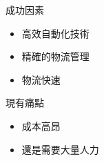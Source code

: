 \documentclass[10pt, aspectratio=169]{beamer}
\begin{document}
\begin{frame}[fragile]{成功因素}
  \begin{itemize}
    \item 高效自動化技術
    \item 精確的物流管理
    \item 物流快速
  \end{itemize}
\end{frame}
\begin{frame}{現有痛點}
  \begin{itemize}
    \item 成本高昂
    \item 還是需要大量人力
  \end{itemize}  
\end{frame}

\end{document}
